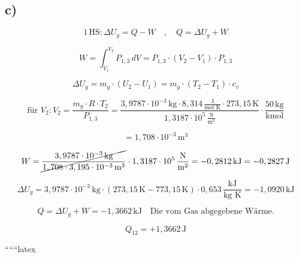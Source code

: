 

\subsection*{c)}

\[
1 \, \text{HS} : \Delta U_{g} = Q - W \quad , \quad Q = \Delta U_{g} + W
\]

\[
W = \int_{V_{1}}^{V_{2}} P_{1,3} \, dV = P_{1,3} \cdot (V_{2} - V_{1}) \cdot P_{1,3}
\]

\[
\Delta U_{g} = m_{g} \cdot (U_{2} - U_{1}) = m_{g} \cdot (T_{2} - T_{1}) \cdot c_{v}
\]

\[
\text{für } V_{2} : V_{2} = \frac{m_{g} \cdot R \cdot T_{2}}{P_{1,3}} = \frac{3,9787 \cdot 10^{-3} \, \text{kg} \cdot 8,314 \, \frac{\text{J}}{\text{mol K}} \cdot 273,15 \, \text{K}}{1,3187 \cdot 10^{5} \, \frac{\text{N}}{\text{m}^2}} \cdot \frac{50 \, \text{kg}}{\text{kmol}}
\]

\[
= 1,708 \cdot 10^{-3} \, \text{m}^3
\]

\[
W = \cancel{\frac{3,9787 \cdot 10^{-3} \, \text{kg}}{1,708 \cdot 3,195 \cdot 10^{-3} \, \text{m}^3}} \cdot 1,3187 \cdot 10^{5} \, \frac{\text{N}}{\text{m}^2} = -0,2812 \, \text{kJ} = -0,2827 \, \text{J}
\]

\[
\Delta U_{g} = 3,9787 \cdot 10^{-3} \, \text{kg} \cdot (273,15 \, \text{K} - 773,15 \, \text{K}) \cdot 0,653 \, \frac{\text{kJ}}{\text{kg K}} = -1,0920 \, \text{kJ}
\]

\[
Q = \Delta U_{g} + W = -1,3662 \, \text{kJ} \quad \text{Die vom Gas abgegebene Wärme.}
\]

\[
Q_{12} = +1,3662 \, \text{J}
\]

``````latex